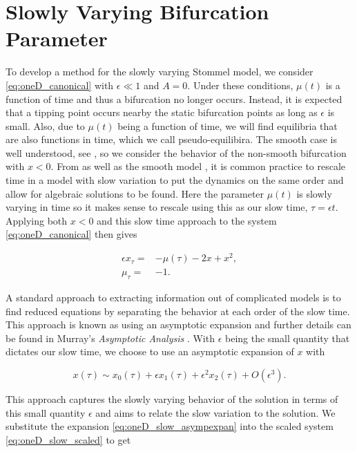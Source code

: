 \section{Slowly Varying Bifurcation Parameter}
\label{sec:oneD_slow}

To develop a method for the slowly varying Stommel model, we consider \eqref{eq:oneD_canonical} with $\epsilon\ll 1$ and $A=0$. Under these conditions, $\mu(t)$ is a function of time and thus a bifurcation no longer occurs. Instead, it is expected that a tipping point occurs nearby the static bifurcation points as long as $\epsilon$ is small. Also, due to $\mu(t)$ being a function of time, we will find equilibria that are also functions in time, which we call pseudo-equilibira. The smooth case is well understood, see \cite{zhu2015tipping}, so we consider the behavior of the non-smooth bifurcation with $x<0$. From \cite{haberman1979slowly} as well as the smooth model \cite{zhu2015tipping}, it is common practice to rescale time in a model with slow variation to put the dynamics on the same order and allow for algebraic solutions to be found. Here the parameter $\mu(t)$ is slowly varying in time so it makes sense to rescale using this as our slow time, $\tau=\epsilon t$. Applying both $x<0$ and this slow time approach to the system \eqref{eq:oneD_canonical} then gives

\begin{equation}\label{eq:oneD_slow_scaled}
\begin{aligned}
\epsilon x_\tau=&-\mu(\tau)-2x+x^2,\\
\mu_\tau=&-1.
\end{aligned}
\end{equation}

\indent A standard approach to extracting information out of complicated models is to find reduced equations by separating the behavior at each order of the slow time. This approach is known as using an asymptotic expansion and further details can be found in Murray's \textit{Asymptotic Analysis} \cite{murray2012asymptotic}. With $\epsilon$ being the small quantity that dictates our slow time, we choose to use an asymptotic expansion of $x$ with

\begin{equation}\label{eq:oneD_slow_asympexpan}
x(\tau)\sim x_0(\tau)+\epsilon x_1(\tau)+\epsilon^2 x_2(\tau)+O(\epsilon^3).
\end{equation}

This approach captures the slowly varying behavior of the solution in terms of this small quantity $\epsilon$ and aims to relate the slow variation to the solution. We substitute the expansion \eqref{eq:oneD_slow_asympexpan} into the scaled system \eqref{eq:oneD_slow_scaled} to get

